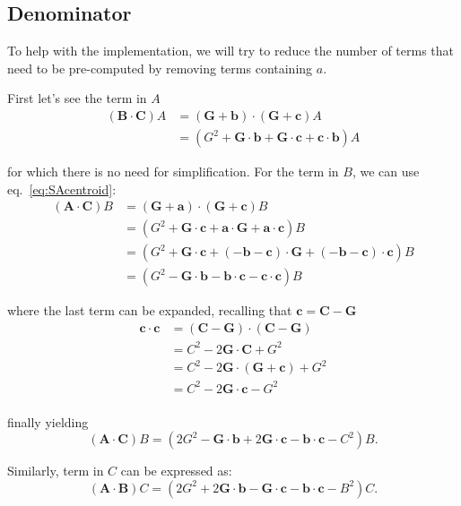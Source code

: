 \documentclass[10pt,a4paper]{article}
\newcommand{\vA}{\mathbf{A}}
\newcommand{\vB}{\mathbf{B}}
\newcommand{\vC}{\mathbf{C}}
\newcommand{\vG}{\mathbf{G}}
\newcommand{\va}{\mathbf{a}}
\newcommand{\vb}{\mathbf{b}}
\newcommand{\vc}{\mathbf{c}}
\begin{document}
  \subsection{Denominator}

To help with the implementation, we will try to reduce the number of terms that need to be pre-computed by removing terms containing $a$.

First let's see the term in $A$
\begin{align}
  ( \vB \cdot \vC ) A
  & = ( \vG + \vb ) \cdot ( \vG + \vc ) A \nonumber \\
  & = ( G^2 + \vG \cdot \vb + \vG \cdot \vc + \vc \cdot \vb) A
  \label{eq:SAdenumeratorA}
\end{align}

for which there is no need for simplification. For the term in $B$, we can use eq.~\eqref{eq:SAcentroid}:
\begin{align*}
  ( \vA \cdot \vC ) B
  & = ( \vG + \va ) \cdot ( \vG + \vc ) B \\
  & = ( G^2 + \vG \cdot \vc + \va \cdot \vG + \va \cdot \vc ) B \\
  & = ( G^2 + \vG \cdot \vc + (-\vb-\vc) \cdot \vG + (-\vb-\vc) \cdot \vc ) B \\
  & = ( G^2 - \vG \cdot \vb - \vb \cdot \vc - \vc \cdot \vc ) B
\end{align*}

where the last term can be expanded, recalling that $\vc = \vC - \vG$
\begin{align*}
  \vc \cdot \vc
  & = ( \vC - \vG ) \cdot ( \vC - \vG ) \\
  & = C^2 - 2 \vG \cdot \vC + G^2 \\
  & = C^2 - 2 \vG \cdot (\vG+\vc) + G^2 \\
  & = C^2 - 2 \vG \cdot \vc - G^2 \\
\end{align*}

finally yielding
\begin{equation}
  ( \vA \cdot \vC ) B
  = ( 2 G^2 - \vG \cdot \vb + 2 \vG \cdot \vc - \vb \cdot \vc - C^2 ) B.
  \label{eq:SAdenumeratorB}
\end{equation}

Similarly, term in $C$ can be expressed as:
\begin{equation}
  ( \vA \cdot \vB ) C
  = ( 2 G^2 + 2 \vG \cdot \vb - \vG \cdot \vc - \vb \cdot \vc - B^2 ) C.
  \label{eq:SAdenumeratorC}
\end{equation}
\end{document}
